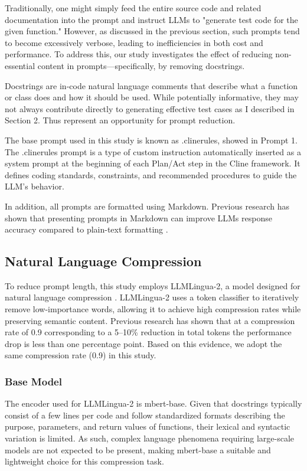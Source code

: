 Traditionally, one might simply feed the entire source code and related documentation into the prompt and instruct LLMs to "generate test code for the given function." However, as discussed in the previous section, such prompts tend to become excessively verbose, leading to inefficiencies in both cost and performance. To address this, our study investigates the effect of reducing non-essential content in prompts—specifically, by removing docstrings.

Docstrings are in-code natural language comments that describe what a function or class does and how it should be used. While potentially informative, they may not always contribute directly to generating effective test cases as I described in Section 2. Thus represent an opportunity for prompt reduction.

The base prompt used in this study is known as .clinerules, showed in Prompt 1. The .clinerules prompt is a type of custom instruction automatically inserted as a system prompt at the beginning of each Plan/Act step in the Cline framework. It defines coding standards, constraints, and recommended procedures to guide the LLM’s behavior.



In addition, all prompts are formatted using Markdown. Previous research has shown that presenting prompts in Markdown can improve LLMs response accuracy compared to plain-text formatting \cite{he2024doespromptformattingimpact}.

\subsection{Natural Language Compression}

To reduce prompt length, this study employs LLMLingua-2, a model designed for natural language compression \cite{pan2024llmlingua2datadistillationefficient}. LLMLingua-2 uses a token classifier to iteratively remove low-importance words, allowing it to achieve high compression rates while preserving semantic content. Previous research has shown that at a compression rate of 0.9 corresponding to a 5–10\% reduction in total tokens the performance drop is less than one percentage point. Based on this evidence, we adopt the same compression rate (0.9) in this study.

\subsubsection{Base Model}
The encoder used for LLMLingua-2 is mbert-base. Given that docstrings typically consist of a few lines per code and follow standardized formats describing the purpose, parameters, and return values of functions, their lexical and syntactic variation is limited. As such, complex language phenomena requiring large-scale models are not expected to be present, making mbert-base a suitable and lightweight choice for this compression task.

